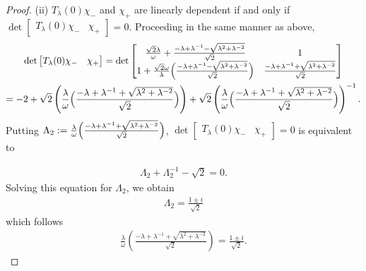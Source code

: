 \documentclass[a4paper,12pt]{article}
\theoremstyle{plain}
\theoremstyle{definition}
\theoremstyle{definition}
\begin{document}
\begin{proof}
($\mathrm{ii}$) $T_{\lambda}(0)\chi_{-}$ and $\chi_{+}$ are linearly dependent if and only if $\det \begin{bmatrix}
T_{\lambda}(0)\chi_-& \chi_+ 
\end{bmatrix}
=0$. Proceeding in the same manner as above,
\begin{gather*}
\det \begin{bmatrix}
T_{\lambda}(0)\chi_-& \chi_+ 
\end{bmatrix}= \det
\begin{bmatrix}
   \frac{\sqrt{2}\lambda}{\omega} +\frac{-\lambda +\lambda^{-1}-\sqrt{\lambda^2+\lambda^{-2}}}{\sqrt{2}} & 1 \\
   1 + \frac{\sqrt{2}\omega}{\lambda}\Bigl(\frac{-\lambda +\lambda^{-1}-\sqrt{\lambda^2+\lambda^{-2}}}{\sqrt{2}}\Bigr) & \frac{-\lambda +\lambda^{-1}+\sqrt{\lambda^2+\lambda^{-2}}}{\sqrt{2}}
\end{bmatrix} \\
=-2+\sqrt{2}\left( \frac{\lambda}{\omega}\Bigl(\frac{-\lambda +\lambda^{-1}+\sqrt{\lambda^2+\lambda^{-2}}}{\sqrt{2}}\Bigr) \right)+\sqrt{2}\left(\frac{\lambda}{\omega}\Bigl(\frac{-\lambda +\lambda^{-1}+\sqrt{\lambda^2+\lambda^{-2}}}{\sqrt{2}}\Bigr)\right)^{-1}.
\end{gather*}
Putting $\Lambda_{2} := \frac{\lambda}{\omega}\Bigl(\frac{-\lambda +\lambda^{-1}+\sqrt{\lambda^2+\lambda^{-2}}}{\sqrt{2}}\Bigr)$, $\det \begin{bmatrix}
T_{\lambda}(0)\chi_-& \chi_+ 
\end{bmatrix}=0$ is equivalent to

\begin{eqnarray*}
\Lambda_{2}+\Lambda_{2}^{-1}-\sqrt{2}=0.
\end{eqnarray*}
Solving this equation for $\Lambda_2$, we obtain
\begin{eqnarray*}
\Lambda_{2} = \frac{1\pm i}{\sqrt{2}}
\end{eqnarray*}
which follows
\begin{eqnarray*}
\frac{\lambda}{\omega}\left(\frac{-\lambda +\lambda^{-1}+\sqrt{\lambda^2+\lambda^{-2}}}{\sqrt{2}}\right) = \frac{1\pm i}{\sqrt{2}}.
\end{eqnarray*}



\end{proof}
\end{document}
